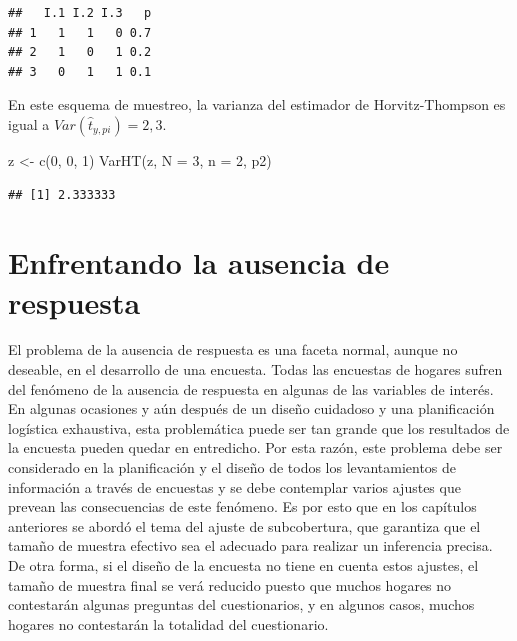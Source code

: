 \documentclass[
  10pt,
  spanish,
]{book}
\newenvironment{Shaded}{\begin{snugshade}}{\end{snugshade}}
\newcommand{\AttributeTok}[1]{\textcolor[rgb]{0.77,0.63,0.00}{#1}}
\newcommand{\DecValTok}[1]{\textcolor[rgb]{0.00,0.00,0.81}{#1}}
\newcommand{\FunctionTok}[1]{\textcolor[rgb]{0.00,0.00,0.00}{#1}}
\newcommand{\NormalTok}[1]{#1}
\newcommand{\OtherTok}[1]{\textcolor[rgb]{0.56,0.35,0.01}{#1}}
\begin{document}
\begin{verbatim}
##   I.1 I.2 I.3   p
## 1   1   1   0 0.7
## 2   1   0   1 0.2
## 3   0   1   1 0.1
\end{verbatim}

En este esquema de muestreo, la varianza del estimador de Horvitz-Thompson es igual a \(Var(\hat t_{y, pi}) = 2,3\).

\begin{Shaded}
\begin{Highlighting}[]
\NormalTok{z }\OtherTok{\textless{}{-}} \FunctionTok{c}\NormalTok{(}\DecValTok{0}\NormalTok{, }\DecValTok{0}\NormalTok{, }\DecValTok{1}\NormalTok{)}
\FunctionTok{VarHT}\NormalTok{(z, }\AttributeTok{N =} \DecValTok{3}\NormalTok{, }\AttributeTok{n =} \DecValTok{2}\NormalTok{, p2)}
\end{Highlighting}
\end{Shaded}

\begin{verbatim}
## [1] 2.333333
\end{verbatim}

\hypertarget{enfrentando-la-ausencia-de-respuesta}{%
\chapter{Enfrentando la ausencia de respuesta}\label{enfrentando-la-ausencia-de-respuesta}}

El problema de la ausencia de respuesta es una faceta normal, aunque no deseable, en el desarrollo de una encuesta. Todas las encuestas de hogares sufren del fenómeno de la ausencia de respuesta en algunas de las variables de interés. En algunas ocasiones y aún después de un diseño cuidadoso y una planificación logística exhaustiva, esta problemática puede ser tan grande que los resultados de la encuesta pueden quedar en entredicho. Por esta razón, este problema debe ser considerado en la planificación y el diseño de todos los levantamientos de información a través de encuestas y se debe contemplar varios ajustes que prevean las consecuencias de este fenómeno. Es por esto que en los capítulos anteriores se abordó el tema del ajuste de subcobertura, que garantiza que el tamaño de muestra efectivo sea el adecuado para realizar un inferencia precisa. De otra forma, si el diseño de la encuesta no tiene en cuenta estos ajustes, el tamaño de muestra final se verá reducido puesto que muchos hogares no contestarán algunas preguntas del cuestionarios, y en algunos casos, muchos hogares no contestarán la totalidad del cuestionario.
\end{document}
